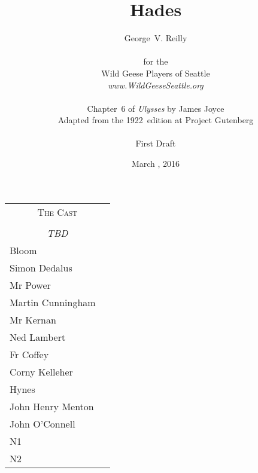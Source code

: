 


\title{\Huge Hades}
\author{George~V. Reilly\\
\\
{\small for the}\\
Wild Geese Players of Seattle\\
{\emph{www.WildGeeseSeattle.org}}\\
\\
{\small Chapter~6 of \emph{Ulysses} by James Joyce}\\
{\small Adapted from the 1922~edition at Project Gutenberg}
\\
\\
{\small First Draft}}
\date{March , 2016}
\raggedbottom



\maketitle
\thispagestyle{empty}
\pagebreak

\begin{tabular}{lp{10cm}}
    \multicolumn{2}{c}{\Large \textsc{The Cast}} \\
\\
    \multicolumn{2}{c}{\large \textit{TBD}} \\
Bloom \\
Simon Dedalus \\
Mr Power \\
Martin Cunningham \\
Mr Kernan \\
Ned Lambert \\
Fr Coffey \\
Corny Kelleher \\
Hynes \\
John Henry Menton \\
John O'Connell \\
N1 \\
N2 \\
\end{tabular}

\thispagestyle{empty}
\newpage


\setcounter{page}{1}










